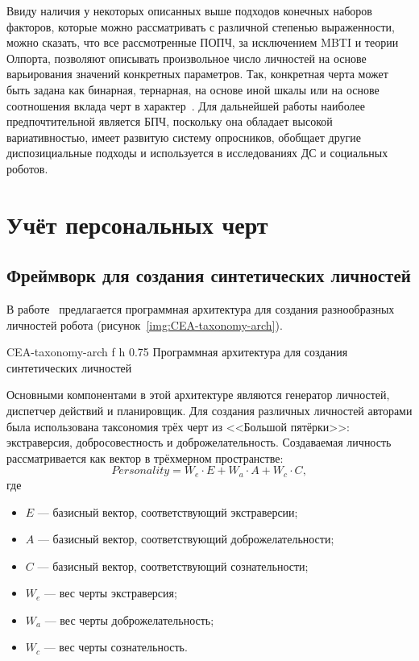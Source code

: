 Ввиду наличия у некоторых описанных выше подходов конечных наборов факторов, которые можно рассматривать с различной степенью выраженности, можно сказать, что все рассмотренные ПОПЧ, за исключением MBTI и теории Олпорта, позволяют описывать произвольное число личностей на основе варьирования значений конкретных параметров.
Так, конкретная черта может быть задана как бинарная, тернарная, на основе иной шкалы или на основе соотношения вклада черт в характер~\cite{cattell_questionnaire, eysenck_questionnaire, big_five_questionairre}.
Для дальнейшей работы наиболее предпочтительной является БПЧ, поскольку она обладает высокой вариативностью, имеет развитую систему опросников, обобщает другие диспозициальные подходы и используется в исследованиях ДС и социальных роботов.

\section{Учёт персональных черт}

\subsection{Фреймворк для создания синтетических личностей}

В работе~\cite{Recchiuto2023SoftwareFramework} предлагается программная архитектура для создания разнообразных личностей робота (рисунок~\ref{img:CEA-taxonomy-arch}).

{CEA-taxonomy-arch}
{f}
{h}
{0.75\textwidth}
{Программная архитектура для создания синтетических личностей}

Основными компонентами в этой архитектуре являются генератор личностей, диспетчер действий и планировщик.
Для создания различных личностей авторами была использована таксономия трёх черт из <<Большой пятёрки>>: экстраверсия, добросовестность и доброжелательность.
Создаваемая личность рассматривается как вектор в трёхмерном пространстве:
\begin{equation}
	\label{equ:personality}
	Personality = W_e \cdot E + W_a \cdot A + W_c \cdot C, 
\end{equation}
где

\begin{itemize}
	\item $E$ --- базисный вектор, соответствующий экстраверсии;
	\item $A$ --- базисный вектор, соответствующий доброжелательности;
	\item $C$ --- базисный вектор, соответствующий сознательности;
	\item $W_e$ --- вес черты экстраверсия;
	\item $W_a$ --- вес черты доброжелательность;
	\item $W_c$ --- вес черты сознательность.
\end{itemize}


